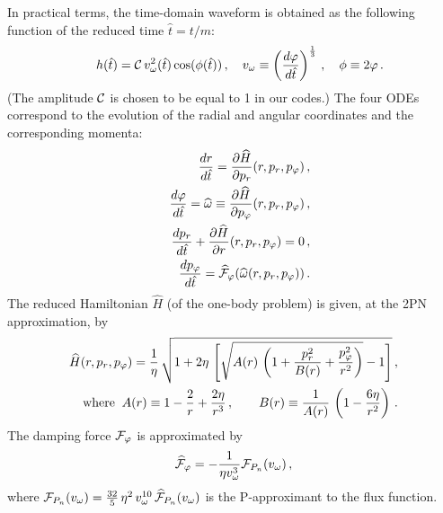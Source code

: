 In practical terms, the time-domain waveform 
is obtained as the following function of the reduced time $\hat{t}=t/m$:
\begin{equation}
\label{4.1}
 \quad h(\hat{t}) = {\cal
C} \, v_{\omega}^2 (\hat{t}) \cos (\phi (\hat{t}))\,, \quad v_{\omega}
\equiv \left( \frac{d \varphi}{d \hat{t}} \right)^{\frac{1}{3}}\,, \quad \phi
\equiv 2\varphi \,.
\end{equation}
(The amplitude $\cal C$ is chosen to be equal to 1 in our codes.)
The four ODEs correspond to the evolution of the radial and angular
coordinates and the corresponding momenta: 
\begin{eqnarray}
\label{eq:3.28}
&&\frac{dr}{d \hat{t}} = \frac{\partial \widehat{H}}{\partial p_r}
(r,p_r,p_\varphi)\,, \\
\label{3.29}
&& \frac{d \varphi}{d \hat{t}} = \widehat{\omega} \equiv \frac{\partial \widehat{H}}{\partial p_\varphi}
(r,p_r,p_\varphi)\,, \\
\label{3.30}
&& \frac{d p_r}{d \hat{t}} + \frac{\partial \widehat{H}}{\partial r}
(r,p_r,p_\varphi)=0\,, \\
&& \frac{d p_\varphi}{d \hat{t}} = \widehat{\cal F}_\varphi(\widehat{\omega} (r,p_r,p_{\varphi}))\,.
\label{3.31}
\end{eqnarray}
The reduced Hamiltonian $\widehat{H}$ (of the one-body problem) 
is given, at the 2PN approximation, by 
\label{eq:4.4}
\begin{eqnarray}
\label{eq:3.32}
\widehat{H}(r,p_r,p_\varphi) = \frac{1}{\eta}\,\sqrt{1 + 2\eta\,\left [
\sqrt{A(r)\,\left (1 + \frac{p_r^2}{B(r)} + \frac{p_\varphi^2}{r^2} \right )} -1 \right ]}\,,\\
\label{3.34}
{\rm where}\;\;
A(r) \equiv 1 - \frac{2}{r} + \frac{2\eta}{r^3} \,,
\quad \quad B(r) \equiv \frac{1}{A(r)}\,\left (1 - \frac{6\eta}{r^2}
\right )\,.
\end{eqnarray}
The damping force $\cal{F}_{\varphi}$ is approximated by
\begin{equation}
\widehat{{\cal F}}_{\varphi}
=-\frac{1}{\eta v_\omega ^3}{\cal F}_{P_n}(v_\omega)\,,
\label{eq:damp}
\end{equation}
where $
{\cal F}_{P_n} (v_{\omega})  
= \frac{32}{5}\,\eta^2\,v_\omega^{10}\,
{\widehat{\cal F}}_{P_n} (v_{\omega})$  
is the P-approximant to the flux function.


